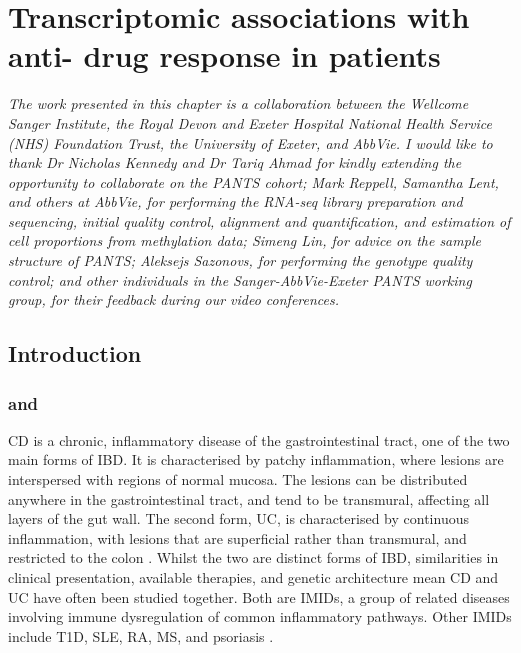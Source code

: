 %
%

\chapter{Transcriptomic associations with anti- drug response in  patients}
\label{ch:multiPANTS}

\textit{
    The work presented in this chapter is a collaboration between 
    the Wellcome Sanger Institute,
    the Royal Devon and Exeter Hospital National Health Service (NHS) Foundation Trust,
    the University of Exeter,
    and AbbVie.
    I would like to thank 
    Dr Nicholas Kennedy and Dr Tariq Ahmad for kindly extending the opportunity to collaborate on the PANTS cohort;
    Mark Reppell, Samantha Lent, and others at AbbVie, for performing the RNA-seq library preparation and sequencing, initial quality control, alignment and quantification, and estimation of cell proportions from methylation data;
    Simeng Lin, for advice on the sample structure of PANTS;
    Aleksejs Sazonovs, for performing the genotype quality control;
    and other individuals in the Sanger-AbbVie-Exeter PANTS working group, for their feedback during our video conferences.
}

\section{Introduction}

\subsection{ and }

\gls{CD} is a chronic, inflammatory disease of the gastrointestinal tract, one of the two main forms of \gls{IBD}.
It is characterised by patchy inflammation, where lesions are interspersed with regions of normal mucosa. 
The lesions can be distributed anywhere in the gastrointestinal tract, and tend to be transmural, affecting all layers of the gut wall.
The second form, \gls{UC}, is characterised by continuous inflammation, with lesions that are superficial rather than transmural, and restricted to the colon \autocite{roda2020CrohnDisease}.
Whilst the two are distinct forms of \gls{IBD}, similarities in clinical presentation, available therapies, and genetic architecture mean \gls{CD} and \gls{UC} have often been studied together.
Both are \glspl{IMID}, a group of related diseases involving immune dysregulation of common inflammatory pathways.
Other \glspl{IMID} include \gls{T1D}, \gls{SLE}, \gls{RA}, \gls{MS}, and psoriasis \autocite{cotsapas2013ImmunemediatedDiseaseGenetics,david2018GeneticsImmunemediatedInflammatory}.

